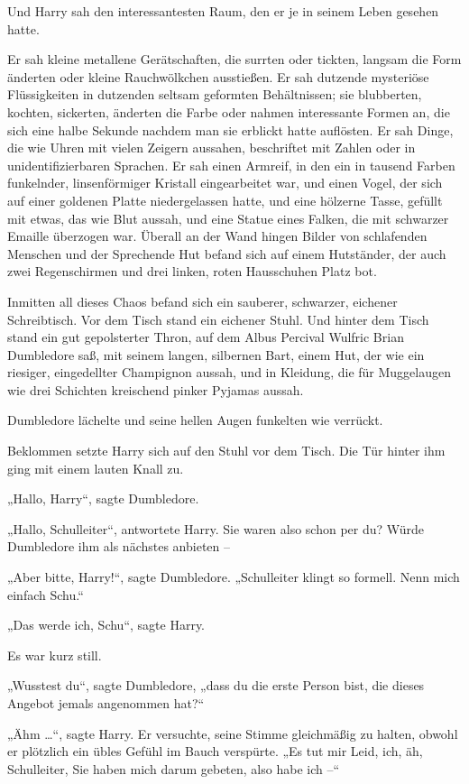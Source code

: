{Und Harry sah den interessantesten Raum, den er je in seinem Leben gesehen hatte.

Er sah kleine metallene Gerätschaften, die surrten oder tickten, langsam die Form änderten oder kleine Rauchwölkchen ausstießen. Er sah dutzende mysteriöse Flüssigkeiten in dutzenden seltsam geformten Behältnissen; sie blubberten, kochten, sickerten, änderten die Farbe oder nahmen interessante Formen an, die sich eine halbe Sekunde nachdem man sie erblickt hatte auflösten. Er sah Dinge, die wie Uhren mit vielen Zeigern aussahen, beschriftet mit Zahlen oder in unidentifizierbaren Sprachen. Er sah einen Armreif, in den ein in tausend Farben funkelnder, linsenförmiger Kristall eingearbeitet war, und einen Vogel, der sich auf einer goldenen Platte niedergelassen hatte, und eine hölzerne Tasse, gefüllt mit etwas, das wie Blut aussah, und eine Statue eines Falken, die mit schwarzer Emaille überzogen war. Überall an der Wand hingen Bilder von schlafenden Menschen und der Sprechende Hut befand sich auf einem Hutständer, der auch zwei Regenschirmen und drei linken, roten Hausschuhen Platz bot.

Inmitten all dieses Chaos befand sich ein sauberer, schwarzer, eichener Schreibtisch. Vor dem Tisch stand ein eichener Stuhl. Und hinter dem Tisch stand ein gut gepolsterter Thron, auf dem Albus Percival Wulfric Brian Dumbledore saß, mit seinem langen, silbernen Bart, einem Hut, der wie ein riesiger, eingedellter Champignon aussah, und in Kleidung, die für Muggelaugen wie drei Schichten kreischend pinker Pyjamas aussah.

Dumbledore lächelte und seine hellen Augen funkelten wie verrückt.

Beklommen setzte Harry sich auf den Stuhl vor dem Tisch. Die Tür hinter ihm ging mit einem lauten Knall zu.

„Hallo, Harry“, sagte Dumbledore.

„Hallo, Schulleiter“, antwortete Harry. Sie waren also schon per du? Würde Dumbledore ihm als nächstes anbieten --

„Aber bitte, Harry!“, sagte Dumbledore. „Schulleiter klingt so formell. Nenn mich einfach Schu.“

„Das werde ich, Schu“, sagte Harry.

Es war kurz still.

„Wusstest du“, sagte Dumbledore, „dass du die erste Person bist, die dieses Angebot jemals angenommen hat?“

„Ähm …“, sagte Harry. Er versuchte, seine Stimme gleichmäßig zu halten, obwohl er plötzlich ein übles Gefühl im Bauch verspürte. „Es tut mir Leid, ich, äh, Schulleiter, Sie haben mich darum gebeten, also habe ich --“

}
